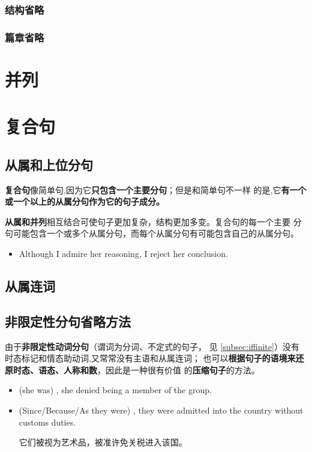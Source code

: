 \subsubsection{结构省略}
\subsubsection{篇章省略}


\section{并列}

\section{复合句}

\subsection{从属和上位分句}

\textbf{复合句}像简单句,因为它\textbf{只包含一个主要分句}；但是和简单句不一样
的是,它\textbf{有一个或一个以上的从属分句作为它的句子成分。}

\textbf{从属和并列}相互结合可使句子更加复杂，结构更加多变。复合句的每一个主要
分句可能包含一个或多个从属分句，而每个从属分句有可能包含自己的从属分句。

\begin{itemize}
\item Although I admire her reasoning, I reject her conclusion.
\end{itemize}

\subsection{从属连词}
\label{subsec:subcon}


\subsection{非限定性分句省略方法}


由于\textbf{非限定性动词分句}（谓词为分词、不定式的句子，
见 \cref{subsec:iffinite}）没有时态标记和情态助动词,又常常没有主语和从属连词；
也可以\textbf{根据句子的语境来还原时态、语态、人称和数}，因此是一种很有价值
的\textbf{压缩句子}的方法。

\begin{itemize}
\item {} (she was) , she denied being a member of the group.
\item (Since/Because/As they were) , they were
  admitted into the country without customs duties.

  它们被视为艺术品，被准许免关税进入该国。
\end{itemize}

